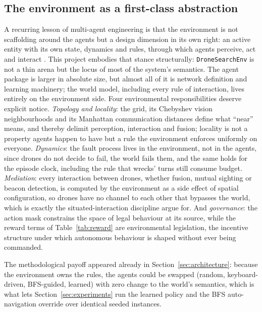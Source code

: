 \subsection{The environment as a first-class abstraction}
\label{subsec:mas-environment}

A recurring lesson of multi-agent engineering is that the environment is not
scaffolding around the agents but a design dimension in its own right: an active
entity with its own state, dynamics and rules, through which agents perceive, act
and interact \citep{weyns2007environment}. This project embodies that stance
structurally: \texttt{DroneSearchEnv} is not a thin arena but the locus of most of
the system's semantics. The agent package is larger in absolute size, but almost
all of it is network definition and learning machinery; the world model,
including every rule of interaction, lives entirely on the environment side.
Four environmental
responsibilities deserve explicit notice. \emph{Topology and locality}: the grid,
its Chebyshev vision neighbourhoods and its Manhattan communication distances
define what ``near'' means, and thereby delimit perception, interaction and
fusion; locality is not a property agents happen to have but a rule the
environment enforces uniformly on everyone. \emph{Dynamics}: the fault process
lives in the environment, not in the agents, since drones do not decide to fail,
the world fails them, and the same holds for the episode clock, including the
rule that wrecks' turns still consume budget. \emph{Mediation}: every interaction
between drones, whether fusion, mutual sighting or beacon detection, is computed
by the environment as a side effect of spatial configuration, so drones have no
channel to each other that bypasses the world, which is exactly the
situated-interaction discipline \citet{weyns2007environment} argue for. And
\emph{governance}: the action mask constrains the space of legal behaviour at its
source, while the reward terms of Table~\ref{tab:reward} are environmental
legislation, the incentive structure under which autonomous behaviour is shaped
without ever being commanded.

The methodological payoff appeared already in Section~\ref{sec:architecture}:
because the environment owns the rules, the agents could be swapped (random,
keyboard-driven, BFS-guided, learned) with zero change to the world's semantics,
which is what lets Section~\ref{sec:experiments} run the learned policy and the
BFS auto-navigation override over identical seeded instances.


